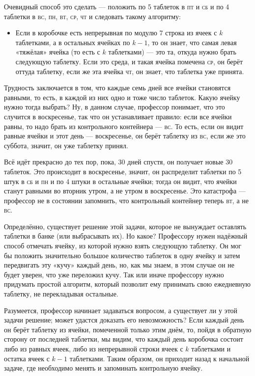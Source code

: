 Очевидный способ это сделать --- положить по 5 таблеток в \textsc{пт} и \textsc{сб} и по 4 таблетки в \textsc{вс}, \textsc{пн}, \textsc{вт}, \textsc{ср}, \textsc{чт} и следовать такому алгоритму:
\begin{itemize}
 \item[]
 Если в коробочке есть непрерывная по модулю 7 строка из ячеек с $k$ таблетками, а в остальных ячейках по $k-1$, то он знает, что самая левая «тяжёлая» ячейка (то есть с $k$ таблетками) --- это та, откуда нужно брать следующую таблетку.
Если это среда, и такая ячейка помечена \textsc{ср}, он берёт оттуда таблетку, если же эта ячейка \textsc{чт}, он знает, что таблетка уже принята.
\end{itemize}

Трудность заключается в том, что каждые семь дней все ячейки становятся равными, то есть, в каждой из них одно и тоже число таблеток.
Какую ячейку нужно тогда выбрать?
Ну, в данном случае, профессор понимает, что это случится в воскресенье, так что он устанавливает правило: если все ячейки равны, то надо брать из контрольного контейнера --- \textsc{вс}.
То есть, если он видит равные ячейки и этот день --- воскресенье, он берёт таблетку из \textsc{вс}, если же это суббота, значит, он уже таблетку принял.

Всё идёт прекрасно до тех пор, пока, 30 дней спустя, он получает новые 30 таблеток.
Это происходит в воскресенье, значит, он распределит таблетки по 5 штук в \textsc{сб} и \textsc{пн} и по 4 штуки в остальные ячейки;
тогда он видит, что ячейки станут равными во вторник утром, а не утром в воскресенье.
Это катастрофа --- профессор не в состоянии запомнить, что контрольный контейнер теперь \textsc{вт}, а не \textsc{вс}.

Определённо, существует решение этой задачи, которое не вынуждает оставлять таблетки в банке (или выбрасывать их).
Но какое? Профессору нужен надёжный способ отмечать ячейку, из которой нужно взять следующую таблетку.
Он мог бы положить значительно большое количество таблеток в одну ячейку и затем передвигать эту «кучу» каждый день, но, как мы знаем, в этом случае он не будет уверен, что уже переложил кучу.
Так или иначе профессору нужно придумать простой алгоритм, который позволит ему принимать свою ежедневную таблетку, не перекладывая остальные.

Разумеется, профессор начинает задаваться вопросом, а существует ли у этой задачи решение;
может удастся доказать его невозможность?
Если каждый день он берёт таблетку из ячейки, помеченной только этим днём, то, пойдя в обратную сторону от последней таблетки, мы видим, что каждый день коробочка состоит либо из равных ячеек, либо из непрерывной строки ячеек с $k$ таблетками и остатка ячеек с $k-1$ таблетками.
Таким образом, он приходит назад к начальной задаче, где необходимо менять и запоминать контрольную ячейку.

